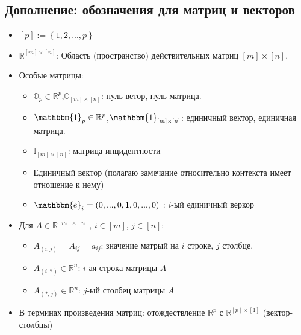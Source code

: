 \subsection{Дополнение: обозначения для матриц и векторов}
\begin{itemize}
\item $\left[ p \right] := \left\lbrace 1,2,...,p \right\rbrace$
\item $\mathbb{R}^{ \left[ m \right] \times \left[ n \right] }$: Область (пространство) действительных матриц  $\left[ m \right] \times \left[ n \right]$.
\item Особые матрицы:  \begin{itemize}
		\item $\mathbb{O}_{p} \in \mathbb{R}^{p}$,$\mathbb{O}_{ \left[ m \right] \times \left[ n \right] }$: нуль-ветор, нуль-матрица.
		\item $\mathbbm{1}_{p} \in \mathbb{R}^{p}$,$\mathbbm{1}_{ \left[ m \right] \times \left[ n \right] }$: единичный вектор, единичная матрица.
		\item $\mathbb{I}_{ \left[ m \right] \times \left[ n \right] }$: матрица инцидентности
		\item Единичный вектор (полагаю замечание относительно контекста имеет отношение к нему)
		\item $\mathbbm{e}_{i}=\left(0,...,0,1,0,...,0 \right)$ : $i$-ый единичный веркор
	   \end{itemize}
\item Для $A \in \mathbb{R}^{ \left[ m \right] \times \left[ n \right] }$, $i \in \left[ m \right]$, $j \in \left[ n \right]$:
	\begin{itemize}
	\item $A_{(i,j)}=A_{ij}=a_{ij}$: значение матрый на $i$ строке, $j$ столбце.
	\item $A_{(i,*)} \in \mathbb{R}^{n}$: $i$-ая строка матрицы $A$
	\item $A_{(*,j)} \in \mathbb{R}^{n}$: $j$-ый столбец матрицы $A$
	\end{itemize}
\item В терминах произведения матриц: отождествление $\mathbb{R}^{p}$ с $\mathbb{R}^{ \left[ p \right] \times \left[ 1 \right]}$ (вектор-столбцы)
\end{itemize}
